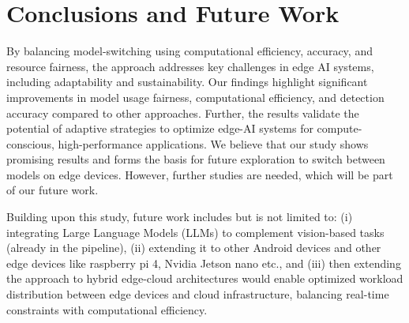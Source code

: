 \section{Conclusions and Future Work}

 By balancing model-switching using computational efficiency, accuracy, and resource fairness, the approach addresses key challenges in edge AI systems, including adaptability and sustainability. Our findings highlight significant improvements in model usage fairness, computational efficiency, and detection accuracy compared to other approaches. 
Further, the results validate the potential of adaptive strategies to optimize edge-AI systems for compute-conscious, high-performance applications. We believe that our study shows promising results and forms the basis for future exploration to switch between models on edge devices. However, further studies are needed, which will be part of our future work.

Building upon this study, future work includes but is not limited to: (i) integrating Large Language Models (LLMs) to complement vision-based tasks (already in the pipeline), (ii) extending it to other Android devices and other edge devices like raspberry pi 4, Nvidia Jetson nano etc., and (iii) then extending the approach to hybrid edge-cloud architectures would enable optimized workload distribution between edge devices and cloud infrastructure, balancing real-time constraints with computational efficiency. 

